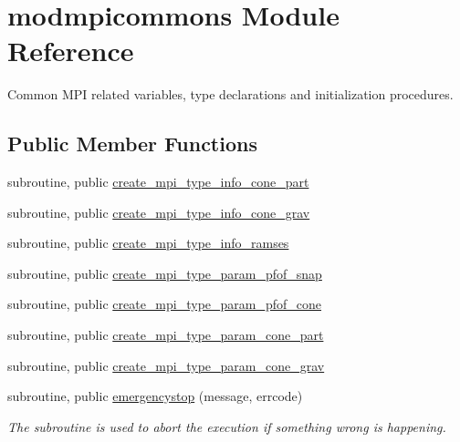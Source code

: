 \hypertarget{classmodmpicommons}{\section{modmpicommons Module Reference}
\label{classmodmpicommons}
}


Common M\-P\-I related variables, type declarations and initialization procedures.  


\subsection*{Public Member Functions}
\begin{DoxyCompactItemize}
\item 
subroutine, public \hyperlink{classmodmpicommons_aa4bf05da4dd24fecb5a01019cb4761bd}{create\-\_\-mpi\-\_\-type\-\_\-info\-\_\-cone\-\_\-part}
\item 
subroutine, public \hyperlink{classmodmpicommons_a462cf966a8c4f578081006dd0631feab}{create\-\_\-mpi\-\_\-type\-\_\-info\-\_\-cone\-\_\-grav}
\item 
subroutine, public \hyperlink{classmodmpicommons_a23a14939cb2ed36bd8a7811ad9eba219}{create\-\_\-mpi\-\_\-type\-\_\-info\-\_\-ramses}
\item 
subroutine, public \hyperlink{classmodmpicommons_abfea7d54faeee68ff1f714bbdba25283}{create\-\_\-mpi\-\_\-type\-\_\-param\-\_\-pfof\-\_\-snap}
\item 
subroutine, public \hyperlink{classmodmpicommons_ace4e1f6e395ff7e6c6aeb609c952a9c1}{create\-\_\-mpi\-\_\-type\-\_\-param\-\_\-pfof\-\_\-cone}
\item 
subroutine, public \hyperlink{classmodmpicommons_a6c5b37e320148b90663b0c47b95f3bb3}{create\-\_\-mpi\-\_\-type\-\_\-param\-\_\-cone\-\_\-part}
\item 
subroutine, public \hyperlink{classmodmpicommons_a753f779e951b4b6e1e239a71763f6add}{create\-\_\-mpi\-\_\-type\-\_\-param\-\_\-cone\-\_\-grav}
\item 
subroutine, public \hyperlink{classmodmpicommons_a04e7d2c785e40fe089fef7c3b3cd5831}{emergencystop} (message, errcode)
\begin{DoxyCompactList}\small\item\em The subroutine is used to abort the execution if something wrong is happening. \end{DoxyCompactList}\end{DoxyCompactItemize}
